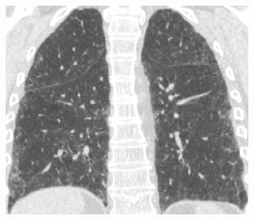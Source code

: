 {\begin{figure}[htbp]
\begin{subfigure}{.32\linewidth}
  \caption{}
  \label{fig:IPFSegmentationResults-f} 
\end{subfigure}
\begin{subfigure}{.32\linewidth}%
  \includegraphics[width=\linewidth,trim={{.0\wd0} {.0\wd0} {.0\wd0} {.0\wd0}},clip]{Segmentation/Image/IPF203_Raw_Coronal364.png}
  \caption{}
  \label{fig:IPFSegmentationResults-g} 
\end{subfigure}

\end{figure}}
